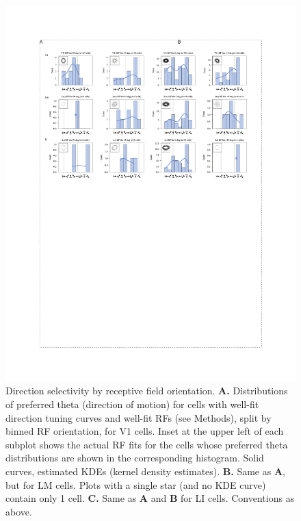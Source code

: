 \begin{figure}[t!]
\includegraphics[width=\textwidth]{figures/supplemental/fig_s10_theta_vs_rf/fig_s10_theta_vs_rf.pdf}
    \vspace{.1in}
    \caption[Direction selectivity and RF orientation]{Direction selectivity by receptive field orientation.
    \textbf{A.} Distributions of preferred theta (direction of motion) for cells with well-fit direction tuning curves and well-fit RFs (see Methods), split by binned RF orientation, for V1 cells. Inset at the upper left of each subplot shows the actual RF fits for the cells whose preferred theta distributions are shown in the corresponding histogram. Solid curves, estimated KDEs (kernel density estimates). 
    \textbf{B.} Same as \textbf{A}, but for LM cells. Plots with a single star (and no KDE curve) contain only 1 cell. 
    \textbf{C.} Same as \textbf{A} and \textbf{B} for LI cells. Conventions as above.
    \label{supfig:theta_vs_rf}}
\end{figure}




